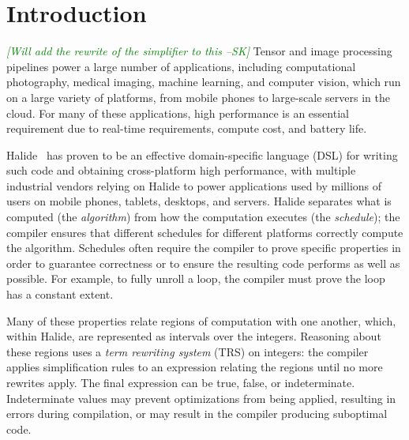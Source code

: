 \documentclass[sigplan,review,anonymous]{acmart}\settopmatter{printfolios=true,printccs=false,printacmref=false}
\newcommand{\sak}[1]{\textcolor{green}{\textit{[{#1} --SK]}}}
\begin{document}
\maketitle


\section{Introduction}
\sak{Will add the rewrite of the simplifier to this}
Tensor and image processing pipelines power a large number of applications,
including computational photography, medical imaging, machine learning,
and computer vision, which run on a large variety of platforms, from
mobile phones to large-scale servers in the cloud.  For many of these
applications, high performance is an essential requirement due to real-time
requirements, compute cost, and battery life.

Halide~\cite{siggraph2012jrk, pldi2013jrk} has proven to be an effective
domain-specific language (DSL) for writing such code and obtaining cross-platform
high performance, with multiple industrial vendors relying on Halide to power
applications used by millions of users on mobile phones, tablets, desktops, and
servers.  Halide separates what is computed (the \textit{algorithm}) from how
the computation executes (the \textit{schedule}); the compiler ensures that
different schedules for different platforms correctly compute the algorithm.
Schedules often require the compiler to prove specific properties in order
to guarantee correctness or to ensure the resulting code performs as well
as possible.  For example, to fully unroll a loop, the compiler must prove
the loop has a constant extent.

Many of these properties relate regions of computation with one another,
which, within Halide, are represented as intervals over the integers.
Reasoning about these regions uses a \textit{term rewriting system}
(TRS) on integers: the compiler applies simplification rules to an expression relating
the regions until no more rewrites apply.  The final expression can be
true, false, or indeterminate.  Indeterminate values may prevent optimizations
from being applied, resulting in errors during compilation, or may result
in the compiler producing suboptimal code.
\end{document}
